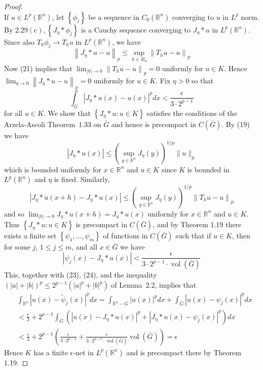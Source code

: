 \begin{proof}
\[  \]
  If $u \in L^p(\mathbb{R}^n)$, let $\left\{\phi_j\right\}$ be a sequence in $C_0(\mathbb{R}^n)$ converging to $u$ in $L^p$ norm. By $2.29(\mathrm{c}),\left\{J_\eta * \phi_j\right\}$ is a Cauchy sequence converging to $J_\eta * u$ in $L^p(\mathbb{R}^n)$. Since also $T_h \phi_j \rightarrow T_h u$ in $L^p(\mathbb{R}^n)$, we have
  \[
  \left\|J_\eta * u-u\right\|_p \leq \sup _{h \in B_\eta}\left\|T_h u-u\right\|_p
  \]
  Now (21) implies that $\lim _{|h| \rightarrow 0}\left\|T_h u-u\right\|_p=0$ uniformly for $u \in K$. Hence $\lim _{\eta \rightarrow 0}\left\|J_\eta * u-u\right\|_p=0$ uniformly for $u \in K$. Fix $\eta>0$ so that
  \[
  \int_{\bar{G}}\left|J_\eta * u(x)-u(x)\right|^p d x<\frac{\epsilon}{3 \cdot 2^{p-1}}
  \]
  for all $u \in K$.
  We show that $\left\{J_\eta * u: u \in K\right\}$ satisfies the conditions of the Arzela-Ascoli Theorem~1.33 on $\bar{G}$ and hence is precompact in $C(\bar{G})$. By (19) we have
  \[
  \left|J_\eta * u(x)\right| \leq\left(\sup _{y \in \mathbb{R}^n} J_\eta(y)\right)^{1 / p}\|u\|_p
  \]
  which is bounded uniformly for $x \in \mathbb{R}^n$ and $u \in K$ since $K$ is bounded in $L^p(\mathbb{R}^n)$ and $\eta$ is fixed. Similarly,
  \[
  \left|J_\eta * u(x+h)-J_\eta * u(x)\right| \leq\left(\sup _{y \in \mathbb{R}^n} J_\eta(y)\right)^{1 / p}\left\|T_h u-u\right\|_p
  \]
  and so $\lim _{|h| \rightarrow 0} J_\eta * u(x+h)=J_\eta * u(x)$ uniformly for $x \in \mathbb{R}^n$ and $u \in K$. Thus $\left\{J_\eta * u: u \in K\right\}$ is precompact in $C(\bar{G})$, and by Theorem 1.19 there exists a finite set $\left\{\psi_1, \ldots, \psi_m\right\}$ of functions in $C(\bar{G})$ such that if $u \in K$, then for some $j$, $1 \leq j \leq m$, and all $x \in \bar{G}$ we have
  \[
  \left|\psi_j(x)-J_\eta * u(x)\right|<\frac{\epsilon}{3 \cdot 2^{p-1} \cdot \operatorname{vol}(\bar{G})}
  \]
  This, together with (23), (24), and the inequality $(|a|+|b|)^p \leq 2^{p-1}\left(|a|^p+|b|^p\right)$ of Lemma~2.2, implies that
  \[
  \begin{aligned}
  & \int_{\mathbb{R}^n}\left|u(x)-\tilde{\psi}_j(x)\right|^p d x=\int_{\mathbb{R}^n-\bar{G}}|u(x)|^p d x+\int_{\bar{G}}\left|u(x)-\psi_j(x)\right|^p d x \\
  &<\frac{\epsilon}{3}+2^{p-1} \int_{\bar{G}}\left(\left|u(x)-J_\eta * u(x)\right|^p+\left|J_\eta * u(x)-\psi_j(x)\right|^p\right) d x \\
  &<\frac{\epsilon}{3}+2^{p-1}\left(\frac{\epsilon}{3 \cdot 2^{p-1}}+\frac{\epsilon}{3 \cdot 2^{p-1} \cdot \operatorname{vol}(\bar{G})} \operatorname{vol}(\bar{G})\right)=\epsilon
  \end{aligned}
  \]
  Hence $K$ has a finite $\epsilon$-net in $L^p(\mathbb{R}^n)$ and is precompact there by Theorem 1.19.
\end{proof}



